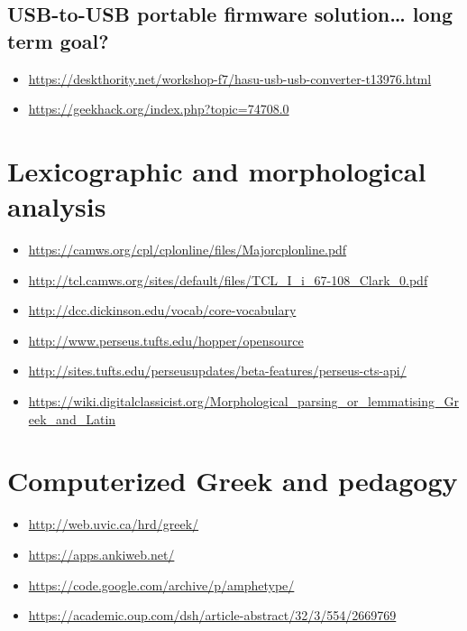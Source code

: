 \documentclass[11pt]{article}
\begin{document}
\subsection{USB-to-USB portable firmware solution\ldots{} long term goal?}
\label{sec:orgf66e5cd}

\begin{itemize}
\item \url{https://deskthority.net/workshop-f7/hasu-usb-usb-converter-t13976.html}
\item \url{https://geekhack.org/index.php?topic=74708.0}
\end{itemize}

\section{Lexicographic and morphological analysis}
\label{sec:orge0aa777}

\begin{itemize}
\item \url{https://camws.org/cpl/cplonline/files/Majorcplonline.pdf}
\item \url{http://tcl.camws.org/sites/default/files/TCL\_I\_i\_67-108\_Clark\_0.pdf}
\item \url{http://dcc.dickinson.edu/vocab/core-vocabulary}
\item \url{http://www.perseus.tufts.edu/hopper/opensource}
\item \url{http://sites.tufts.edu/perseusupdates/beta-features/perseus-cts-api/}
\item \url{https://wiki.digitalclassicist.org/Morphological\_parsing\_or\_lemmatising\_Greek\_and\_Latin}
\end{itemize}

\section{Computerized Greek and pedagogy}
\label{sec:orga84a8bb}

\begin{itemize}
\item \url{http://web.uvic.ca/hrd/greek/}
\item \url{https://apps.ankiweb.net/}
\item \url{https://code.google.com/archive/p/amphetype/}
\item \url{https://academic.oup.com/dsh/article-abstract/32/3/554/2669769}
\end{itemize}
\end{document}
